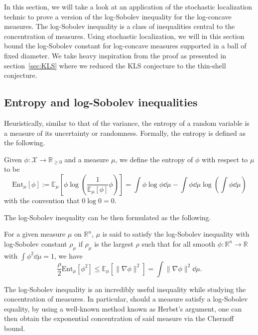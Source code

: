 In this section, we will take a look at an application of the stochastic localization technic 
to prove a version of the log-Sobolev inequality for the log-concave measures. The log-Sobolev inequality 
is a class of inequalities central to the concentration of measures. Using stochastic localization, 
we will in this section bound the log-Sobolev constant for log-concave measures 
supported in a ball of fixed diameter. We take heavy inspiration from the proof as presented in section~\ref{sec:KLS}
where we reduced the KLS conjecture to the thin-shell conjecture.

\subsection{Entropy and log-Sobolev inequalities}

Heuristically, similar to that of the variance, the entropy of a random variable is a measure of its 
uncertainty or randomness. Formally, the entropy is defined as the following.

\begin{definition}[Entropy]
  Given \(\phi : \mathcal{X} \to \mathbb{R}_{\ge 0}\) and a measure \(\mu\), we define the entropy of \(\phi\) 
  with respect to \(\mu\) to be 
  \[\text{Ent}_\mu[\phi] := \mathbb{E}_\mu\left[\phi \log\left(\frac{1}{\mathbb{E}_\mu[\phi]} \phi\right)\right]
   = \int \phi \log \phi \dd \mu - \int \phi \dd \mu \log\left(\int \phi \dd \mu\right)\]
  with the convention that \(0\log 0 = 0\).
\end{definition}
The log-Sobolev inequality can be then formulated as the following.
\begin{definition}
  For a given measure \(\mu\) on \(\mathbb{R}^n\), \(\mu\) is said to satisfy the log-Sobolev inequality with log-Sobolev 
  constant \(\rho_\mu\) if \(\rho_\mu\) is the largest \(\rho\) such that for all smooth 
  \(\phi : \mathbb{R}^n \to \mathbb{R}\) with \(\int \phi^2 \dd \mu = 1\), we have 
  \[\frac{\rho}{2} \text{Ent}_\mu[\phi^2] \le \mathbb{E}_\mu[\|\nabla \phi\|^2] = \int \|\nabla \phi\|^2 \dd \mu.\]
\end{definition}

The log-Sobolev inequality is an incredibly useful inequality while studying the concentration of measures. In 
particular, should a measure satisfy a log-Sobolev equality, by using a well-known method known as Herbst's argument,
one can then obtain the exponential concentration of said measure via the Chernoff bound. 


